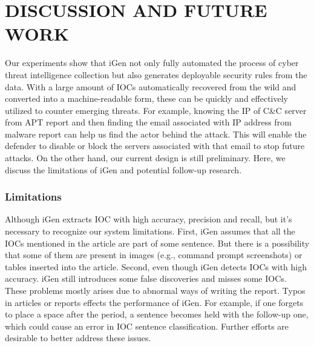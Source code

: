 \chapter{DISCUSSION AND FUTURE WORK} \label{chap:discussion}
Our experiments show that iGen not only fully automated the process of cyber threat intelligence collection but also generates deployable security rules from the data. With a large amount of IOCs automatically recovered from the wild and converted into a machine-readable form, these can be quickly and effectively utilized to counter emerging threats. For example, knowing the IP of C\&C server from APT report and then finding the email associated with IP address from malware report can help us find the actor behind the attack. This will enable the defender to disable or block the servers associated with that email to stop future attacks. On the other hand, our current design is still preliminary. Here, we discuss the limitations of iGen and potential follow-up research.

\subsection{Limitations}
Although iGen extracts IOC with high accuracy, precision and recall, but it's necessary to recognize our system limitations. First, iGen assumes that all the IOCs mentioned in the article are part of some sentence. But there is a possibility that some of them are present in images (e.g., command prompt screenshots) or tables inserted into the article. Second, even though iGen detects IOCs with high accuracy. iGen still introduces some false discoveries and misses some IOCs. These problems mostly arises due to abnormal ways of writing the report. Typos in articles or reports effects the performance of iGen. For example, if one forgets to place a space after the period, a sentence becomes held with the follow-up one, which could cause an error in IOC sentence classification. Further efforts are desirable to better address these issues.